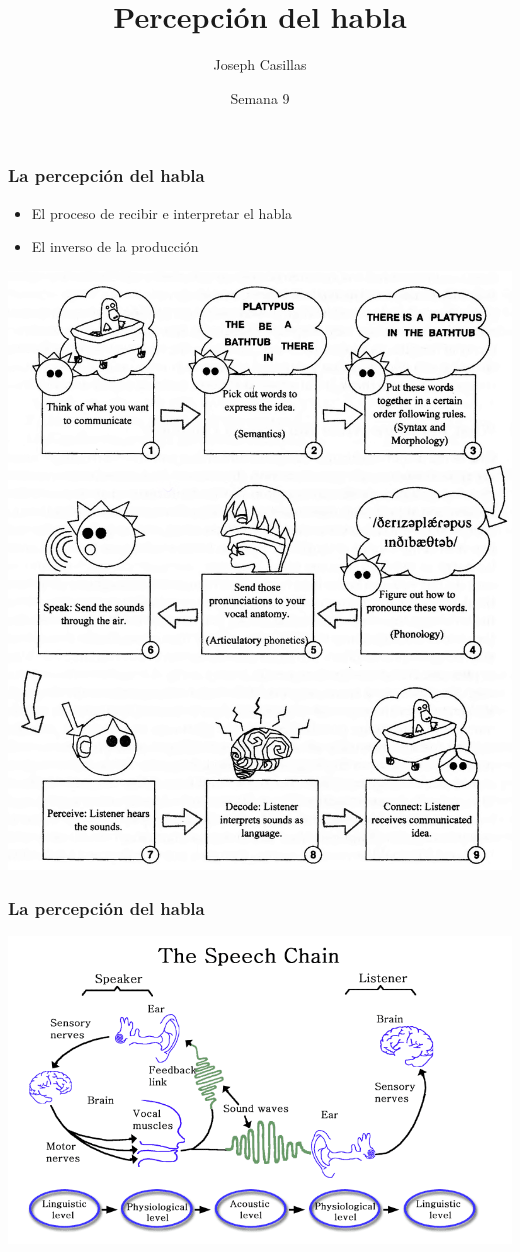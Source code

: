 \documentclass{beamer}
\title{Percepción del habla}
\author[Casillas]{Joseph Casillas}
\institute{Universidad de Arizona}
\date{Semana 9}
\begin{document}
\begin{frame}%
  \titlepage
\end{frame}


\begin{frame}
\frametitle{La percepción del habla}

	\begin{itemize}
		\item El proceso de recibir e interpretar el habla
		\item El inverso de la producción
	\end{itemize}
\end{frame}

\begin{frame}[plain]

	\begin{center}
		\includegraphics[width=.6\textwidth]{figures/cadena_hablada.png}
	\end{center}
\end{frame}

\begin{frame}
	\frametitle{La percepción del habla}
	
	\includegraphics[width=\textwidth]{figures/cadena_hablada2.png}
\end{frame}
\end{document}
